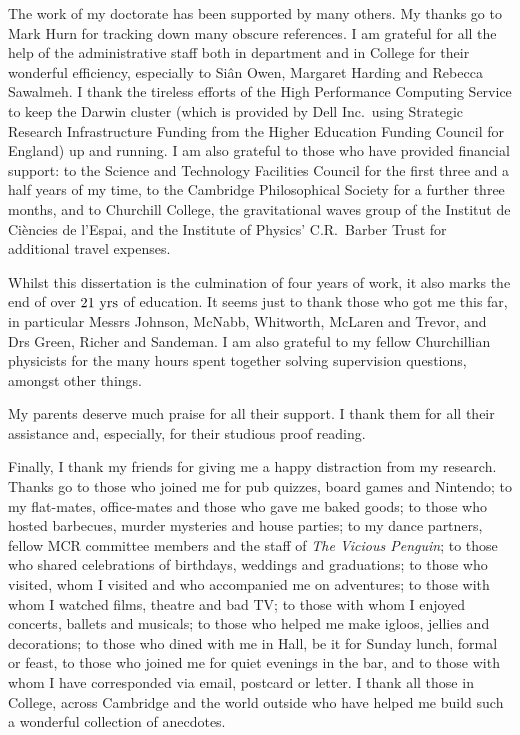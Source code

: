 The work of my doctorate has been supported by many others. My thanks go to Mark Hurn for tracking down many obscure references. I am grateful for all the help of the administrative staff both in department and in College for their wonderful efficiency, especially to Si{\^a}n Owen, Margaret Harding and Rebecca Sawalmeh. I thank the tireless efforts of the High Performance Computing Service to keep the Darwin cluster (which is provided by Dell Inc.\ using Strategic Research Infrastructure Funding from the Higher Education Funding Council for England) up and running. I am also grateful to those who have provided financial support: to the Science and Technology Facilities Council for the first three and a half years of my time, to the Cambridge Philosophical Society for a further three months, and to Churchill College, the gravitational waves group of the Institut de Ci{\`e}ncies de l'Espai, and the Institute of Physics' C.R.\ Barber Trust for additional travel expenses.

Whilst this dissertation is the culmination of four years of work, it also marks the end of over $21~\mathrm{yrs}$ of education. It seems just to thank those who got me this far, in particular Messrs Johnson, McNabb, Whitworth, McLaren and Trevor, and Drs Green, Richer and Sandeman. I am also grateful to my fellow Churchillian physicists for the many hours spent together solving supervision questions, amongst other things.

My parents deserve much praise for all their support. I thank them for all their assistance and, especially, for their studious proof reading.

Finally, I thank my friends for giving me a happy distraction from my research. Thanks go to those who joined me for pub quizzes, board games and Nintendo; to my flat-mates, office-mates and those who gave me baked goods; to those who hosted barbecues, murder mysteries and house parties; to my dance partners, fellow MCR committee members and the staff of \textit{The Vicious Penguin}; to those who shared celebrations of birthdays, weddings and graduations; to those who visited, whom I visited and who accompanied me on adventures; to those with whom I watched films, theatre and bad TV; to those with whom I enjoyed concerts, ballets and musicals; to those who helped me make igloos, jellies and decorations; to those who dined with me in Hall, be it for Sunday lunch, formal or feast, to those who joined me for quiet evenings in the bar, and to those with whom I have corresponded via email, postcard or letter. I thank all those in College, across Cambridge and the world outside who have helped me build such a wonderful collection of anecdotes.

